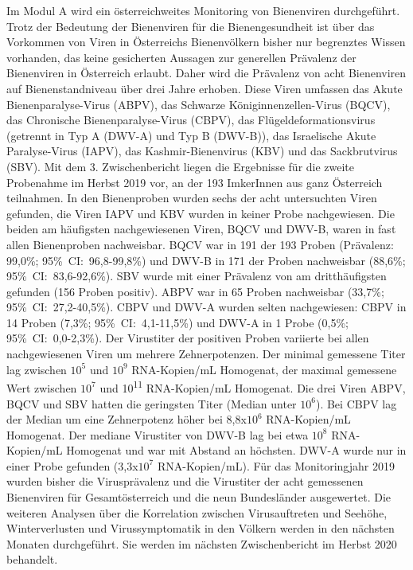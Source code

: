 Im Modul A wird ein österreichweites Monitoring von Bienenviren durchgeführt. Trotz der Bedeutung der Bienenviren für die Bienengesundheit ist über das Vorkommen von Viren in Österreichs Bienenvölkern bisher nur begrenztes Wissen vorhanden, das keine gesicherten Aussagen zur generellen Prävalenz der Bienenviren in Österreich erlaubt. Daher wird die Prävalenz von acht Bienenviren auf Bienenstandniveau über drei Jahre erhoben. Diese Viren umfassen das Akute Bienenparalyse-Virus (ABPV), das Schwarze Königinnenzellen-Virus (BQCV), das Chronische Bienenparalyse-Virus (CBPV), das Flügeldeformationsvirus (getrennt in Typ A (DWV-A) und Typ B (DWV-B)), das Israelische Akute Paralyse-Virus (IAPV), das Kashmir-Bienenvirus (KBV) und das Sackbrutvirus (SBV). 
\newline
Mit dem 3. Zwischenbericht liegen die Ergebnisse für die zweite Probenahme im Herbst 2019 vor, an der 193 ImkerInnen aus ganz Österreich teilnahmen. In den Bienenproben wurden sechs der acht untersuchten Viren gefunden, die Viren IAPV und KBV wurden in keiner Probe nachgewiesen. Die beiden am häufigsten nachgewiesenen Viren, BQCV und DWV-B, waren in fast allen Bienenproben nachweisbar. BQCV war in 191 der 193 Proben (Prävalenz: 99,0\%; 95\%~CI:~96,8-99,8\%) und DWV-B in 171 der Proben nachweisbar (88,6\%; 95\%~CI:~83,6-92,6\%). SBV wurde mit einer Prävalenz von   am dritthäufigsten gefunden (156 Proben positiv). ABPV war in 65 Proben nachweisbar (33,7\%; 95\%~CI:~27,2-40,5\%). CBPV und DWV-A wurden selten nachgewiesen: CBPV in 14 Proben (7,3\%; 95\%~CI:~4,1-11,5\%) und DWV-A in 1 Probe (0,5\%; 95\%~CI:~0,0-2,3\%). 
\newline
Der Virustiter der positiven Proben variierte bei allen nachgewiesenen Viren um mehrere Zehnerpotenzen. Der minimal gemessene Titer lag zwischen $10^5$ und $10^9$ RNA-Kopien/\si{\milli\liter} Homogenat, der maximal gemessene Wert zwischen $10^7$ und 10\textsuperscript{11} RNA-Kopien/\si{\milli\liter} Homogenat. Die drei Viren ABPV, BQCV und SBV hatten die geringsten Titer (Median unter $10^6$). Bei CBPV lag der Median um eine Zehnerpotenz höher bei 8,8x$10^6$ RNA-Kopien/\si{\milli\liter} Homogenat. Der mediane Virustiter von DWV-B lag bei etwa $10^8$ RNA-Kopien/\si{\milli\liter} Homogenat und war mit Abstand an höchsten. DWV-A wurde nur in einer Probe gefunden (3,3x$10^7$ RNA-Kopien/\si{\milli\liter}).
\newline
Für das Monitoringjahr 2019 wurden bisher die Virusprävalenz und die Virustiter der acht
gemessenen Bienenviren für Gesamtösterreich und die neun Bundesländer ausgewertet. Die
weiteren Analysen über die Korrelation zwischen Virusauftreten und Seehöhe, Winterverlusten
und Virussymptomatik in den Völkern werden in den nächsten Monaten durchgeführt. Sie
werden im nächsten Zwischenbericht im Herbst 2020 behandelt.